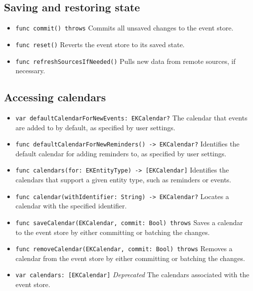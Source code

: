 \documentclass{article}
\begin{document}
\subsection*{Saving and restoring state}

\begin{itemize}
    \item \texttt{func commit() throws}
    Commits all unsaved changes to the event store.

    \item \texttt{func reset()}
    Reverts the event store to its saved state.

    \item \texttt{func refreshSourcesIfNeeded()}
    Pulls new data from remote sources, if necessary.
\end{itemize}

\subsection*{Accessing calendars}

\begin{itemize}
    \item \texttt{var defaultCalendarForNewEvents: EKCalendar?}
    The calendar that events are added to by default, as specified by user settings.

    \item \texttt{func defaultCalendarForNewReminders() -> EKCalendar?}
    Identifies the default calendar for adding reminders to, as specified by user settings.

    \item \texttt{func calendars(for: EKEntityType) -> [EKCalendar]}
    Identifies the calendars that support a given entity type, such as reminders or events.

    \item \texttt{func calendar(withIdentifier: String) -> EKCalendar?}
    Locates a calendar with the specified identifier.

    \item \texttt{func saveCalendar(EKCalendar, commit: Bool) throws}
    Saves a calendar to the event store by either committing or batching the changes.

    \item \texttt{func removeCalendar(EKCalendar, commit: Bool) throws}
    Removes a calendar from the event store by either committing or batching the changes.

    \item \texttt{var calendars: [EKCalendar]} \textit{Deprecated}
    The calendars associated with the event store.
\end{itemize}
\end{document}

